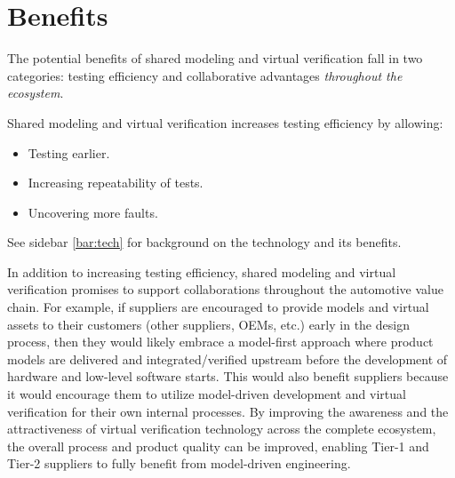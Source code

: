 \section{Benefits} \label{sec:benefits}
The potential benefits of shared modeling and virtual verification fall in two categories:
testing efficiency and collaborative advantages \emph{throughout the ecosystem}.

Shared modeling and virtual verification increases testing efficiency by allowing:

\begin{itemize}
    \item Testing earlier.
    \item Increasing repeatability of tests.
    \item Uncovering more faults.
\end{itemize}

See sidebar \ref{bar:tech} for background on the technology and its benefits.

In addition to increasing testing efficiency,
shared modeling and virtual verification promises to support collaborations throughout the automotive value chain.
%
%
For example, if suppliers are encouraged to provide models and virtual assets to their customers (other suppliers, OEMs, etc.) early in the design process,
then they would likely embrace a model-first
approach where product models are delivered and integrated/verified upstream before the development of hardware and low-level software starts.
This would also benefit suppliers because it would encourage them to utilize model-driven development and virtual verification for their own internal processes.
By improving the awareness and the attractiveness of virtual verification technology across the complete ecosystem, the overall process and product quality can be improved, enabling Tier-1 and Tier-2 suppliers to fully benefit from model-driven engineering.

